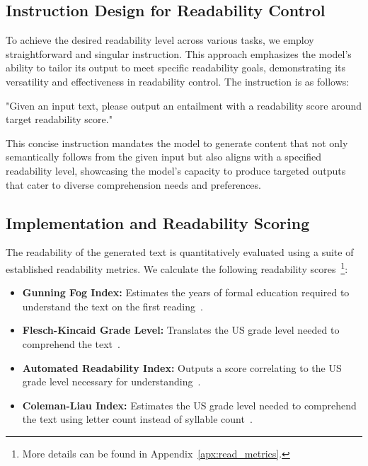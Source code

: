 \documentclass[11pt]{article}
\begin{document}
\subsection{Instruction Design for Readability Control}

To achieve the desired readability level across various tasks, we employ straightforward and singular instruction. This approach emphasizes the model's ability to tailor its output to meet specific readability goals, demonstrating its versatility and effectiveness in readability control. The instruction is as follows:

"Given an input text, please output an entailment with a readability score around {target readability score}."

This concise instruction mandates the model to generate content that not only semantically follows from the given input but also aligns with a specified readability level, showcasing the model's capacity to produce targeted outputs that cater to diverse comprehension needs and preferences.


\subsection{Implementation and Readability Scoring}

The readability of the generated text is quantitatively evaluated using a suite of established readability metrics. We calculate the following readability scores~\footnote{More details can be found in Appendix~\ref{apx:read_metrics}.}:

\begin{itemize}
[leftmargin=.1in,topsep=0.3pt]
\setlength\itemsep{0em}
\vspace{-0.2em}
    \item \textbf{Gunning Fog Index:} Estimates the years of formal education required to understand the text on the first reading~\cite{gunning1952technique}.
    \item \textbf{Flesch-Kincaid Grade Level:} Translates the US grade level needed to comprehend the text~\cite{kincaid1975derivation}.
    \item \textbf{Automated Readability Index:} Outputs a score correlating to the US grade level necessary for understanding~\cite{senter1967automated}.
    \item \textbf{Coleman-Liau Index:} Estimates the US grade level needed to comprehend the text using letter count instead of syllable count~\cite{coleman1975computer}.
\end{itemize}
\end{document}
